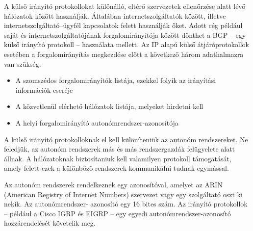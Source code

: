 A külső irányító protokollokat különálló, eltérő szervezetek ellenőrzése alatt lévő hálózatok
között használják. Általában internetszolgáltatók között, illetve internetszolgáltató–ügyfél
kapcsolatok felett használják őket. Adott cég például saját és internetszolgáltatójának
forgalomirányítója között dönthet a BGP – egy külső irányító protokoll – használata mellett.
Az IP alapú külső átjáróprotokollok esetében a forgalomirányítás megkezdése előtt a
következő három adathalmazra van szükség:
\begin{itemize}
	\item A szomszédos forgalomirányítók listája, ezekkel folyik az irányítási információk cseréje
	\item A közvetlenül elérhető hálózatok listája, melyeket hirdetni kell
	\item A helyi forgalomirányító autonómrendszer-azonosítója
\end{itemize}

A külső irányító protokolloknak el kell különíteniük az autonóm rendszereket. Ne feledjük, az
autonóm rendszerek más és más rendszergazdák felügyelete alatt állnak. A hálózatoknak
biztosítaniuk kell valamilyen protokoll támogatását, amely felett ezek a különböző rendszerek
kommunikálni tudnak egymással.

Az autonóm rendszerek rendelkeznek egy azonosítóval, amelyet az ARIN (American Registry
of Internet Numbers) szervezet vagy egy szolgáltató oszt ki nekik. Az autonómrendszer-
azonosító egy 16 bites szám. Az irányító protokollok – például a Cisco IGRP és EIGRP – egy
egyedi autonómrendszer-azonosító hozzárendelését követelik meg.